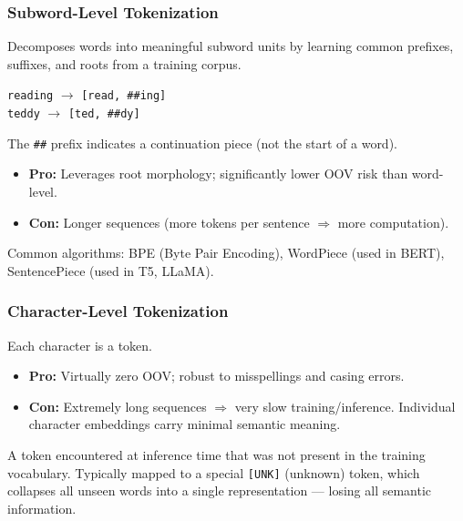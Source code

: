 \documentclass[11pt, a4paper]{article}
\begin{document}
\subsubsection{Subword-Level Tokenization}

Decomposes words into meaningful subword units by learning common prefixes, suffixes, and roots from a training corpus.

\begin{exbox}
\texttt{reading} $\to$ \texttt{[read, \#\#ing]}\\
\texttt{teddy} $\to$ \texttt{[ted, \#\#dy]}

The \texttt{\#\#} prefix indicates a continuation piece (not the start of a word).
\end{exbox}

\begin{itemize}[leftmargin=2em]
  \item \textbf{Pro:} Leverages root morphology; significantly lower OOV risk than word-level.
  \item \textbf{Con:} Longer sequences (more tokens per sentence $\Rightarrow$ more computation).
\end{itemize}

Common algorithms: BPE (Byte Pair Encoding), WordPiece (used in BERT), SentencePiece (used in T5, LLaMA).

\subsubsection{Character-Level Tokenization}

Each character is a token.

\begin{itemize}[leftmargin=2em]
  \item \textbf{Pro:} Virtually zero OOV; robust to misspellings and casing errors.
  \item \textbf{Con:} Extremely long sequences $\Rightarrow$ very slow training/inference. Individual character embeddings carry minimal semantic meaning.
\end{itemize}

\begin{defbox}
A token encountered at inference time that was not present in the training vocabulary. Typically mapped to a special \texttt{[UNK]} (unknown) token, which collapses all unseen words into a single representation --- losing all semantic information.
\end{defbox}
\end{document}

